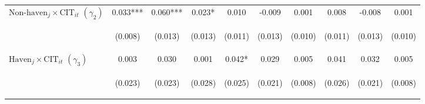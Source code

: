 \documentclass[twoside,a4paper,11pt]{article}
\begin{document}
\begin{table}
{\begin{tabular}{lccc|ccc|ccc}
			$\text{Non-haven}_j\times\text{CIT}_{it}$ $ (\gamma_2)$ & 0.033*** & 0.060*** & 0.023* & 0.010 & -0.009 & 0.001 & 0.008 & -0.008 & 0.001 \\
			\vspace{4pt} & \begin{footnotesize}(0.008)\end{footnotesize} & \begin{footnotesize}(0.013)\end{footnotesize} & \begin{footnotesize}(0.013)\end{footnotesize} & \begin{footnotesize}(0.011)\end{footnotesize} & \begin{footnotesize}(0.013)\end{footnotesize} & \begin{footnotesize}(0.010)\end{footnotesize} & \begin{footnotesize}(0.011)\end{footnotesize} & \begin{footnotesize}(0.013)\end{footnotesize} & \begin{footnotesize}(0.010)\end{footnotesize} \\
			$\text{Haven}_j\times\text{CIT}_{it}$ $ (\gamma_3)$ & 0.003 & 0.030 & 0.001 & 0.042* & 0.029 & 0.005 & 0.041 & 0.032 & 0.005 \\
			& \begin{footnotesize}(0.023)\end{footnotesize} & \begin{footnotesize}(0.023)\end{footnotesize} & \begin{footnotesize}(0.028)\end{footnotesize} & \begin{footnotesize}(0.025)\end{footnotesize} & \begin{footnotesize}(0.021)\end{footnotesize} & \begin{footnotesize}(0.008)\end{footnotesize} & \begin{footnotesize}(0.026)\end{footnotesize} & \begin{footnotesize}(0.021)\end{footnotesize} & \begin{footnotesize}(0.008)\end{footnotesize} \\

\end{tabular}}
\end{table}
\end{document}
